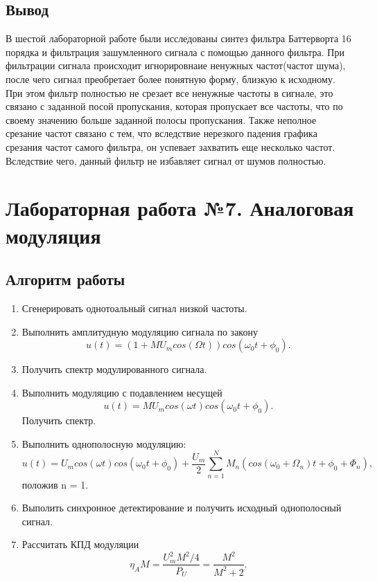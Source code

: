 \documentclass[10pt,a4paper]{report}
\begin{document}
\section{Вывод}
В шестой лабораторной работе были исследованы синтез фильтра Баттерворта 16 порядка и фильтрация зашумленного сигнала с помощью данного фильтра.
При фильтрации сигнала происходит игнорировнаие ненужных частот(частот шума), после чего сигнал преобретает более понятную форму, близкую к исходному. При этом фильтр
полностью не срезает все ненужные частоты в сигнале, это связано с заданной посой пропускания, которая пропускает все частоты, что по своему значению больше заданной полосы пропускания.
Также неполное срезание частот связано с тем, что вследствие нерезкого падения графика срезания частот самого фильтра, он успевает захватить еще несколько частот. 
Вследствие чего, данный фильтр не избавляет сигнал от шумов полностью.

\chapter{Лабораторная работа №7. Аналоговая модуляция}
\section{Алгоритм работы}


	\begin{enumerate}
		\item Сгенерировать однотоальный сигнал низкой частоты.
		\item Выполнить амплитудную модуляцию сигнала по закону
				\begin{equation}
					u(t) = (1+MU_m cos(\Omega t))cos(\omega_0 t+\phi_0).
				\end{equation}
		\item Получить спектр модулированного сигнала.
		\item Выполнить модуляцию с подавлением несущей 
				\begin{equation}
					u(t) = MU_m cos(\omega t)cos(\omega_0 t+\phi_0).
				\end{equation}
		      Получить спектр. 
		\item Выполнить однополосную модуляцию:
				\begin{equation}
					u(t) = U_m cos(\omega t)cos(\omega_0 t+\phi_0)+\frac{U_m}{2}\sum_{n=1}^N M_n (cos(\omega_0 + \Omega_n )t + \phi_0 + \Phi_n ),
				\end{equation}
				положив n = 1.
		\item Выполить синхронное детектирование и получить исходный однополосный сигнал.
		\item Рассчитать КПД модуляции
				\begin{equation}
					\eta_A M = \frac{U_m ^2 M^2 /4}{P_U} = \frac{M^2}{M^2 + 2}.
				\end{equation}
	\end{enumerate}
\end{document}
